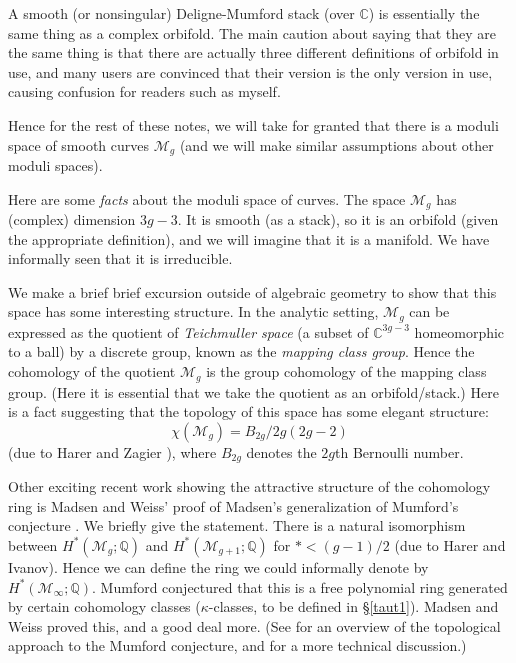 \documentclass[12pt,letterpaper]{amsart}
\newcommand{\Q}{\mathbb{Q}}
\newcommand{\C}{\mathbb{C}}
\newcommand{\ka}{\kappa}
\newcommand{\cm}{{\mathcal{M}}}
\newcommand{\lremind}[1]{{\bf[label:  #1]}}
\renewcommand{\lremind}[1]{{}}
\begin{document}
{A smooth (or nonsingular) Deligne-Mumford stack (over $\C$) is
essentially the same thing as a complex orbifold.  The main caution
about saying that they are the same thing is that there are actually
three different definitions of orbifold in use, and many users are
convinced that their version is the only version in use, causing
confusion for readers such as myself.

Hence for the rest of these notes, we will take for granted
that there is a moduli space of smooth curves $\cm_g$ (and we 
will make similar assumptions about other moduli spaces).


Here are some {\em facts} about the moduli space of curves.  The space
$\cm_g$ has (complex) dimension $3g-3$.  It is smooth (as a stack), so
it is an orbifold (given the appropriate definition), and we will
imagine that it is a manifold.  We have informally seen that it is
irreducible.

We make a brief brief excursion outside of algebraic geometry to show
that this space has some interesting structure.  In the analytic
setting, $\cm_g$ can be expressed as the quotient of {\em Teichmuller
  space} (a subset of $\C^{3g-3}$ homeomorphic to a ball) by a
discrete group, known as the {\em mapping class group}.  Hence the
cohomology of the quotient $\cm_g$ is the group cohomology of the
mapping class group.  (Here it is essential that we take the quotient
as an orbifold/stack.)  Here is a fact suggesting that the topology of
this space has some elegant structure: \lremind{hzeq}
\begin{equation}\label{hzeq}
\chi(\cm_{g}) =
B_{2g} / 2g (2g-2)
\end{equation} (due to Harer and Zagier \cite{hz}), where
$B_{2g}$ denotes the $2g$th Bernoulli number.

Other exciting recent work showing the attractive structure of the
cohomology ring is Madsen and Weiss' proof of Madsen's generalization
of Mumford's conjecture \cite{mw}.  We briefly give the statement.
There is a natural isomorphism between $H^*(\cm_g;\Q)$ and $H^*(\cm_{g+1};\Q)$
for $*<(g-1)/2$ (due to Harer and Ivanov).
Hence we can define the ring we could informally denote by
$H^*(\cm_{\infty}; \Q)$.  Mumford conjectured that this is a free
polynomial ring generated by certain cohomology classes
($\ka$-classes, to be defined in \S \ref{taut1}).  Madsen and Weiss proved this,
and a good deal more.  (See \cite{tillmann} for an overview of the
topological approach to the Mumford conjecture, and \cite{mt} for a
more technical discussion.)

}
\end{document}
